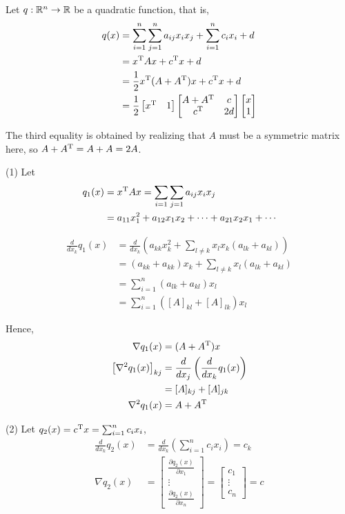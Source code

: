 \begin{example} Let $q: \mathbb{R}^n \rightarrow \mathbb{R}$ be a quadratic function, that is,
\begin{align*}
q(x) &= \sum^n_{i=1}\sum^n_{j=1}a_{ij}x_ix_j + \sum^n_{i=1}c_ix_i + d\\
&= x^{\trans}Ax + c^{\trans}x + d\\
&= \frac{1}{2}x^{\trans}(A + A^{\trans})x + c^{\trans}x + d\\
&= \frac{1}{2}
\begin{bmatrix}%
x^{\trans}& 1
\end{bmatrix}
\begin{bmatrix}%
A + A^{\trans} & c\\
c^{\trans} & 2d
\end{bmatrix}
\begin{bmatrix}%
x\\
1
\end{bmatrix}
\end{align*}

The third equality is obtained by realizing that $A$ must be a symmetric matrix here, so $A + A^{{\rm T}} = A + A=2A$.


(1) Let
\begin{align*}
q_1(x) &= x^{{\rm T}}Ax = \sum_{i=1}\sum_{j=1}a_{ij}x_ix_j\\
&= a_{11}x_1^2 + a_{12}x_1x_2 + \cdots + a_{21}x_2x_1 +\cdots
\end{align*}

\begin{align*}
\frac{d}{dx_k}q_1(x) &= \frac{d}{dx_k}\left(a_{kk}x_k^2 + \sum_{l\neq k}x_lx_k(a_{lk}+a_{kl})\right)\\
&= (a_{kk} + a_{kk})x_k + \sum_{l\neq k}x_l(a_{lk} + a_{kl}) \\
&= \sum^n_{i=1}(a_{lk} + a_{kl})x_l\\
&= \sum^n_{i=1}\left([A]_{kl} + [A]_{lk}\right)x_l
\end{align*}

Hence,
\begin{align*}
\nabla q_1(x) &= (A + A^{{\rm T}})x\\
\left[\nabla^2 q_1(x)\right]_{kj} &= \frac{d}{dx_j}\left(\frac{d}{d x_k}q_1(x)\right)\\
&= [A]_{kj} + [A]_{jk}\\
\nabla^2 q_1(x) &= A + A^{{\rm T}}
\end{align*}

(2) Let $q_2(x) = c^{{\rm T}}x = \sum^n_{i=1}c_ix_i$,
\begin{align*}
\frac{d}{dx_k} q_2(x) &= \frac{d}{dx_k}\left(\sum^n_{i=1}c_ix_i\right) = c_k\\
\nabla q_2(x) &= 
\begin{bmatrix}%
\frac{\partial q_2(x)}{\partial x_1}\\
\vdots\\
\frac{\partial q_2(x)}{\partial x_n}
\end{bmatrix}=
\begin{bmatrix}%
c_1\\
\vdots\\
c_n
\end{bmatrix} = c
\end{align*}


\end{example}
